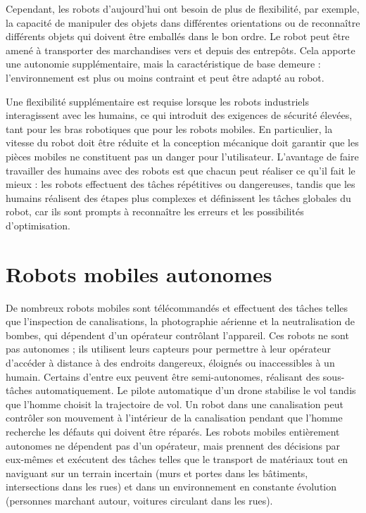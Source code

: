 Cependant, les robots d'aujourd'hui ont besoin de plus de flexibilité, par exemple, la capacité de manipuler des objets dans différentes orientations ou de reconnaître différents objets qui doivent être emballés dans le bon ordre. Le robot peut être amené à transporter des marchandises vers et depuis des entrepôts. Cela apporte une autonomie supplémentaire, mais la caractéristique de base demeure : l'environnement est plus ou moins contraint et peut être adapté au robot.

Une flexibilité supplémentaire est requise lorsque les robots industriels interagissent avec les humains, ce qui introduit des exigences de sécurité élevées, tant pour les bras robotiques que pour les robots mobiles. En particulier, la vitesse du robot doit être réduite et la conception mécanique doit garantir que les pièces mobiles ne constituent pas un danger pour l'utilisateur. L'avantage de faire travailler des humains avec des robots est que chacun peut réaliser ce qu'il fait le mieux : les robots effectuent des tâches répétitives ou dangereuses, tandis que les humains réalisent des étapes plus complexes et définissent les tâches globales du robot, car ils sont prompts à reconnaître les erreurs et les possibilités d'optimisation.

\section{Robots mobiles autonomes}

De nombreux robots mobiles sont télécommandés et effectuent des tâches telles que l'inspection de canalisations, la photographie aérienne et la neutralisation de bombes, qui dépendent d'un opérateur contrôlant l'appareil. Ces robots ne sont pas autonomes ; ils utilisent leurs capteurs pour permettre à leur opérateur d'accéder à distance à des endroits dangereux, éloignés ou inaccessibles à un humain. Certains d'entre eux peuvent être semi-autonomes, réalisant des sous-tâches automatiquement. Le pilote automatique d'un drone stabilise le vol tandis que l'homme choisit la trajectoire de vol. Un robot dans une canalisation peut contrôler son mouvement à l'intérieur de la canalisation pendant que l'homme recherche les défauts qui doivent être réparés. Les robots mobiles entièrement autonomes ne dépendent pas d'un opérateur, mais prennent des décisions par eux-mêmes et exécutent des tâches telles que le transport de matériaux tout en naviguant sur un terrain incertain (murs et portes dans les bâtiments, intersections dans les rues) et dans un environnement en constante évolution (personnes marchant autour, voitures circulant dans les rues).

